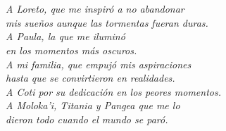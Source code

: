 \chapter*{}
\begin{flushright}
\textit{A Loreto, que me inspiró a no abandonar \\mis sueños aunque las tormentas fueran duras. \\
A Paula, la que me iluminó \\en los momentos más oscuros.\\
A mi familia, que empujó mis aspiraciones\\ hasta que se convirtieron en realidades.\\
A Coti por su dedicación en los peores momentos.\\
A Moloka'i, Titania y Pangea que me lo\\ dieron todo cuando el mundo se paró.\\
}
\end{flushright}